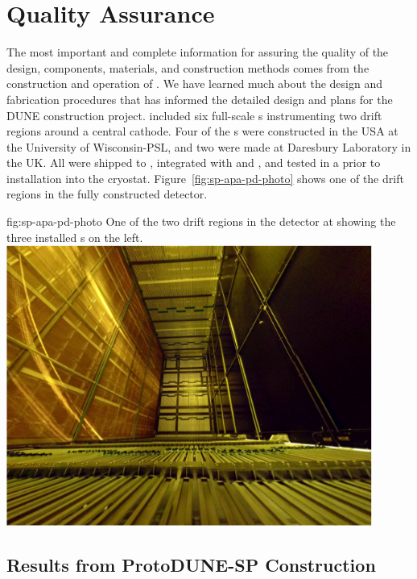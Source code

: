 \section{Quality Assurance}
\label{sec:fdsp-apa-qa}


The most important and complete information for assuring the quality of the  design, components, materials, and construction methods comes from the construction and operation of .  We have learned much about the design and fabrication procedures that has informed the detailed design and plans for the DUNE  construction project.  included six full-scale  s instrumenting two drift regions around a central cathode.  Four of the  s were constructed in the USA at the University of Wisconsin-PSL, and two were made at Daresbury Laboratory in the UK. All were shipped to , integrated with  and , and tested in a \coldbox prior to installation into the  cryostat.  Figure~\ref{fig:sp-apa-pd-photo} shows one of the drift regions in the fully constructed  detector.

\begin{dunefigure}{fig:sp-apa-pd-photo}
{One of the two drift regions in the  detector at  showing the three installed s on the left.}
\includegraphics[width=0.9\textwidth]{graphics/sp-apa-protodune-photo.jpg}
\end{dunefigure}


\subsection{Results from ProtoDUNE-SP Construction}
\label{sec:fdsp-apa-qa-protodune-const}

